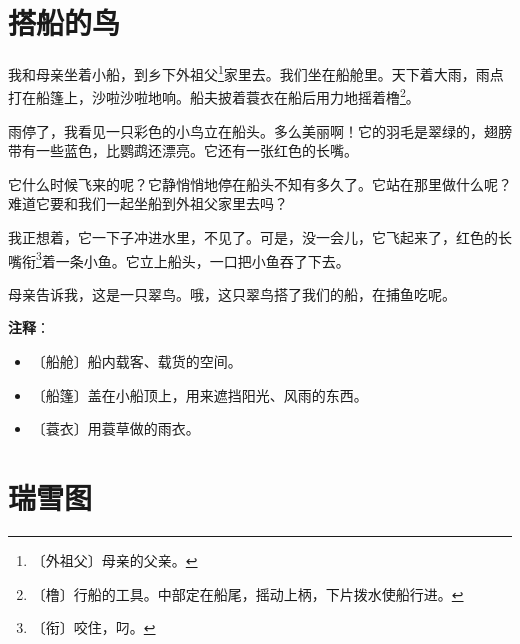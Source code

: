 \documentclass[12pt,UTF-8,openany]{ctexbook}
\begin{document}
\chapter{搭船的鸟}

\begin{large}
    
    我和母亲坐着小船，到乡下外祖父\footnote{〔外祖父〕母亲的父亲。}家里去。我们坐在船舱里。天下着大雨，雨点打在船篷上，沙啦沙啦地响。船夫披着蓑衣在船后用力地摇着橹\footnote{〔橹〕行船的工具。中部定在船尾，摇动上柄，下片拨水使船行进。}。
    
    雨停了，我看见一只彩色的小鸟立在船头。多么美丽啊！它的羽毛是翠绿的，翅膀带有一些蓝色，比鹦鹉还漂亮。它还有一张红色的长嘴。
    
    它什么时候飞来的呢？它静悄悄地停在船头不知有多久了。它站在那里做什么呢？难道它要和我们一起坐船到外祖父家里去吗？
    
    我正想着，它一下子冲进水里，不见了。可是，没一会儿，它飞起来了，红色的长嘴衔\footnote{〔衔〕咬住，叼。}着一条小鱼。它立上船头，一口把小鱼吞了下去。
    
    母亲告诉我，这是一只翠鸟。哦，这只翠鸟搭了我们的船，在捕鱼吃呢。
    
\end{large}


\newpage

\textbf{注释}：

\vspace{-1em}

\begin{itemize}
    \setlength\itemsep{-0.2em}
    \item 〔船舱〕船内载客、载货的空间。
    \item 〔船篷〕盖在小船顶上，用来遮挡阳光、风雨的东西。
    \item 〔蓑衣〕用蓑草做的雨衣。
\end{itemize}

\chapter{瑞雪图}
\end{document}

